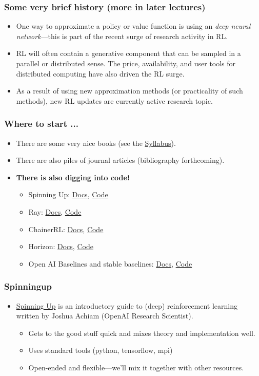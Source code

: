 \documentclass{beamer}
\begin{document}
\begin{frame}
  \frametitle{Some very brief history (more in later lectures)}
  \begin{itemize}
  \item One way to approximate a policy or value function is using an {\em
      deep neural network}---this is part of the recent surge of research activity in RL.
  \item RL will often contain a generative component that can be sampled in a
    parallel or distributed sense. The price, availability, and user tools for
    distributed computing have also driven the RL surge.
  \item As a result of using new approximation methods (or practicality of such methods),
    new RL updates are currently active research topic.
  \end{itemize}
\end{frame}

\begin{frame}
  \frametitle{Where to start ...}
  \begin{itemize}
  \item There are some very nice books (see the
    \href{https://github.com/jhineman/spring2019ece590hineman}{Syllabus}).
  \item There are also piles of journal articles (bibliography forthcoming).
  \item {\bf There is also digging into code!}
    \begin{itemize}
    \item Spinning Up: \href{https://spinningup.openai.com/en/latest/}{Docs}, \href{https://github.com/openai/spinningup}{Code}
    \item Ray: \href{}{Docs}, \href{}{Code}
    \item ChainerRL: \href{}{Docs}, \href{}{Code}
    \item Horizon: \href{}{Docs}, \href{}{Code}
    \item Open AI Baselines and stable baselines: \href{}{Docs}, \href{}{Code}
    \end{itemize}
  \end{itemize}
\end{frame}

\begin{frame}
  \frametitle{Spinningup}
  \begin{itemize}
  \item \href{https://spinningup.openai.com/en/latest/}{Spinning Up} is an
    introductory guide to (deep) reinforcement learning written by Joshua Achiam
    (OpenAI Research Scientist).
    \begin{itemize}
    \item Gets to the good stuff quick and mixes theory and implementation well.
    \item Uses standard tools (python, tensorflow, mpi)
    \item Open-ended and flexible---we'll mix it together with other resources.
    \end{itemize}
  \end{itemize}
\end{frame}
\end{document}
